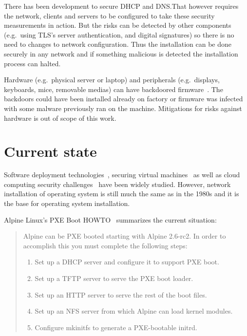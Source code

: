 There has been development to secure DHCP and DNS.\@ That however
requires the network, clients and servers to be configured to take
these security measurements in action. But the risks can be detected
by other components (e.g.\ using TLS's server authentication, and
digital signatures) so there is no need to changes to network
configuration. Thus the installation can be done securely in any
network and if something malicious is detected the installation
process can halted.


Hardware (e.g.\ physical server or laptop) and peripherals (e.g.\
displays, keyboards, mice, removable medias) can have backdoored
firmware~\cite{swierczynski2016interdiction}. The backdoors could have
been installed already on factory or firmware was infected with some
malware previously ran on the machine. Mitigations for risks against
hardware is out of scope of this work.


\section{Current state}

Software deployment technologies~\cite{SoftDep}, securing virtual
machines~\cite{Garfinkel2005} as well as cloud computing security
challenges~\cite{Owens2010}\cite{Hashizume2013} have been widely
studied. However, network installation of operating system is still
much the same as in the 1980s and it is the base for operating system installation.

Alpine Linux's PXE Boot HOWTO~\cite{alpine-pxe-boot-howto} summarizes
the current situation:

\begin{quote}
Alpine can be PXE booted starting with Alpine 2.6-rc2. In order to
accomplish this you must complete the following steps:

\begin{enumerate}
\item Set up a DHCP server and configure it to support PXE boot.
\item Set up a TFTP server to serve the PXE boot loader.
\item Set up an HTTP server to serve the rest of the boot files.
\item Set up an NFS server from which Alpine can load kernel modules.
\item Configure mkinitfs to generate a PXE-bootable initrd.
\end{enumerate}
\end{quote}

